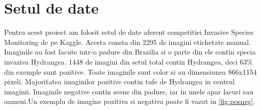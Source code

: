 \documentclass{article}
\begin{document}
\section{Setul de date}
Pentru acest proiect am folosit setul de date aferent competitiei Invasive Species Monitoring\cite{WEBSITE:6} de pe Kaggle. Acesta consta din 2295 de imagini etichetate manual. Imaginile au fost facute intr-o padure din Brazilia si o parte din ele contin specia invaziva Hydrangea. 1448 de imagini din setul total contin Hydrangea, deci 63\% din exemple sunt pozitive. Toate imaginile sunt color si au dimensiunea 866x1154 pixeli. Majoritatea imaginilor pozitive contin tufe de Hydrangea in centrul imaginii. Imaginile negative contin scene din padure, iar in unele apar lacuri sau oameni.Un exemplu de imagine pozitiva si negativa poate fi vazut in \ref{fig:posneg}.
\end{document}
